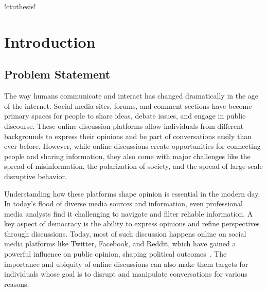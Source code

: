 \documentclass[twoside]{ctuthesis}
\theoremstyle{plain}
\theoremstyle{definition}
\theoremstyle{note}
\begin{document}
\renewcommand \ctulstsep{0pt}

\newcommand\ctuclsname{\leavevmode\unhcopy\ctuclsnamebox}
\newsavebox\ctuclsnamebox
\begin{lrbox}{\ctuclsnamebox}
\ctulst!ctuthesis!
\end{lrbox}

\maketitle

\chapter{Introduction}

\section{Problem Statement}
\par
The way humans communicate and interact has changed dramatically in the age of the internet. Social media sites, forums, and comment sections have become primary spaces for people to share ideas, debate issues, and engage in public discourse. These online discussion platforms allow individuals from different backgrounds to express their opinions and be part of conversations easily than ever before. However, while online discussions create opportunities for connecting people and sharing information, they also come with major challenges like the spread of misinformation, the polarization of society, and the spread of large-scale disruptive behavior.\par

Understanding how these platforms shape opinion is essential in the modern day. In today's flood of diverse media sources and information, even professional media analysts find it challenging to navigate and filter reliable information. A key aspect of democracy is the ability to express opinions and refine perspectives through discussions. Today, most of such discussion happens online on social media platforms like Twitter, Facebook, and Reddit, which have gained a powerful influence on public opinion, shaping political outcomes~\cite{Bennett2012DigitalMedia}. The importance and ubiquity of online discussions can also make them targets for individuals whose goal is to disrupt and manipulate conversations for various reasons.\par
\end{document}
